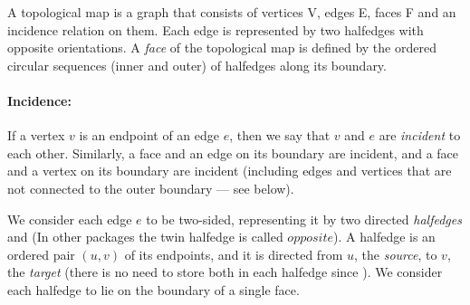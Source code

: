A topological map is a graph that consists of vertices V,
edges E, faces F and an incidence relation on them. %
Each edge is represented by two halfedges with opposite orientations.
A {\em face} of the topological map is defined by the ordered
circular sequences 
(inner and outer) of halfedges along its boundary. 

\paragraph{Incidence:}
If a vertex $v$ is an endpoint of an edge $e$, then we say that $v$
and $e$ are {\em incident} to each other. Similarly, a face and an
edge on its boundary are incident, and a face and a vertex on its
boundary are incident (including edges and vertices that are not connected 
to the outer boundary --- see below).

We consider each edge $e$ to be two-sided, representing it by two
directed {\em halfedges}  and 
(In other packages the twin halfedge is called $opposite$).  
A halfedge  is an ordered pair $(u,v)$ of its endpoints, and
it is directed from $u$, the {\em source}, to $v$, the {\em target} (there 
is no need to store both in each halfedge since 
%
).
We consider each halfedge to lie on the boundary of a single face.



